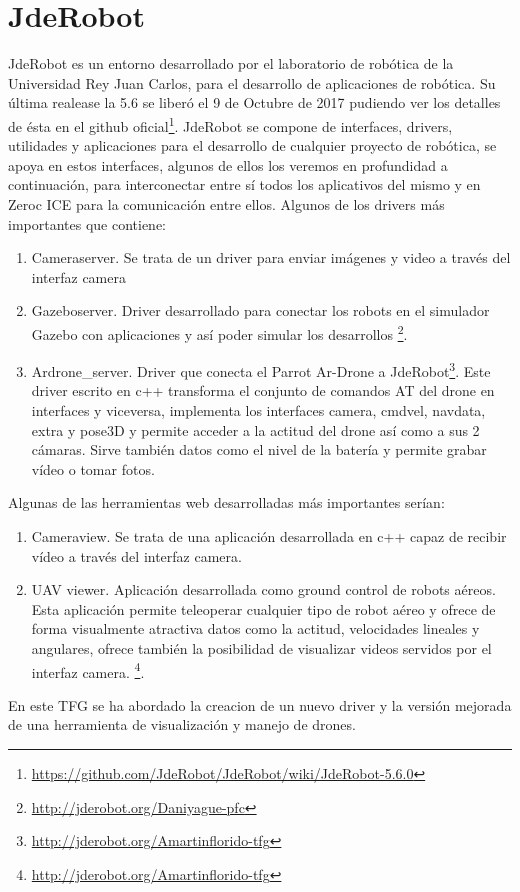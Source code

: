 \section{JdeRobot}
\label{sec:jderobot}

JdeRobot es un entorno desarrollado por el laboratorio de robótica de la Universidad Rey Juan Carlos, para el desarrollo de aplicaciones de robótica. Su última realease la 5.6 se liberó el 9 de Octubre de 2017 pudiendo ver los detalles de ésta en el github oficial\footnote{\url{https://github.com/JdeRobot/JdeRobot/wiki/JdeRobot-5.6.0}}.
JdeRobot se compone de interfaces, drivers, utilidades y aplicaciones para el desarrollo de cualquier proyecto de robótica, se apoya en estos interfaces, algunos de ellos los veremos en profundidad a continuación, para interconectar entre sí todos los aplicativos del mismo y en Zeroc ICE para la comunicaci\'on entre ellos.
Algunos de los drivers más importantes que contiene:
\begin{enumerate}
\item Cameraserver. Se trata de un driver para enviar imágenes y video a través del interfaz camera
\item Gazeboserver. Driver desarrollado para conectar los robots en el simulador Gazebo con aplicaciones y así poder simular los desarrollos \footnote{\url{http://jderobot.org/Daniyague-pfc}}.
\item Ardrone\_server. Driver que conecta el Parrot Ar-Drone a JdeRobot\footnote{\url{http://jderobot.org/Amartinflorido-tfg}}. Este driver escrito en c++ transforma el conjunto de comandos AT del drone en interfaces y viceversa, implementa los interfaces camera, cmdvel, navdata, extra y pose3D y permite acceder a la actitud del drone así como a sus 2 cámaras. Sirve también datos como el nivel de la batería y permite grabar vídeo o tomar fotos.
\end{enumerate}
Algunas de las herramientas web desarrolladas más importantes serían:
\begin{enumerate}
\item Cameraview. Se trata de una aplicaci\'on desarrollada en c++ capaz de recibir vídeo a través del interfaz camera.
\item UAV viewer. Aplicaci\'on desarrollada como ground control de robots aéreos. Esta aplicaci\'on permite teleoperar cualquier tipo de robot aéreo y ofrece de forma visualmente atractiva datos como la actitud, velocidades lineales y angulares, ofrece también la posibilidad de visualizar videos servidos por el interfaz camera. \footnote{\url{http://jderobot.org/Amartinflorido-tfg}}.
\end{enumerate}
En este TFG se ha abordado la creacion de un nuevo driver y la versión mejorada de una herramienta de visualización y manejo de drones.

